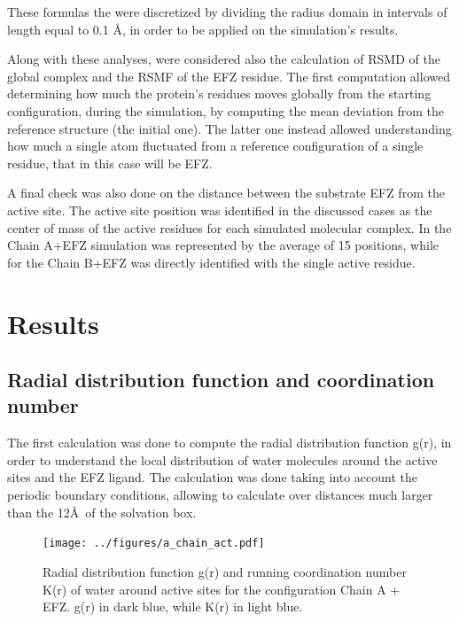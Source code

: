 \documentclass[12pt]{article}
\begin{document}
These formulas the were discretized by dividing the radius domain in intervals of length equal to 0.1 \AA, in order to be applied on the simulation's results.

Along with these analyses, were considered also the calculation of RSMD of the global complex and the RSMF of the EFZ residue. The first computation allowed determining how much the protein's residues moves globally from the starting configuration, during the simulation, by computing the mean deviation from the reference structure (the initial one). The latter one instead allowed understanding how much a single atom fluctuated from a reference configuration of a single residue, that in this case will be EFZ.

A final check was also done on the distance between the substrate EFZ from the active site. The active site position was identified in the discussed cases as the center of mass of the active residues for each simulated molecular complex. In the Chain A+EFZ simulation was represented by the average of 15 positions, while for the Chain B+EFZ was directly identified with the single active residue.
\section{Results}

\subsection{Radial distribution function and coordination number}
The first calculation was done to compute the radial distribution function g(r), in order to understand the local distribution of water molecules around the active sites and the EFZ ligand. The calculation was done taking into account the periodic boundary conditions, allowing to calculate over distances much larger than the 12\AA \, of the solvation box.

\begin{figure}
    \centering
    \texttt{[image: ../figures/a\_chain\_act.pdf]}
    \caption{Radial distribution function g(r) and running coordination number K(r) of water around active sites for the configuration Chain A + EFZ. g(r) in dark blue, while K(r) in light blue.\label{fig:gofr_chain_a_efz_1}}
\end{figure}
\end{document}
